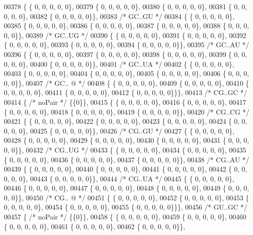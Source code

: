 \begin{DoxyCode}
00378 \{ \{  0, 0, 0, 0, 0\},
00379 \{  0, 0, 0, 0, 0\},
00380 \{  0, 0, 0, 0, 0\},
00381 \{  0, 0, 0, 0, 0\},
00382 \{  0, 0, 0, 0, 0\}\},
00383  \textcolor{comment}{/* GC..GU */}
00384 \{ \{  0, 0, 0, 0, 0\},
00385 \{  0, 0, 0, 0, 0\},
00386 \{  0, 0, 0, 0, 0\},
00387 \{  0, 0, 0, 0, 0\},
00388 \{  0, 0, 0, 0, 0\}\},
00389  \textcolor{comment}{/* GC..UG */}
00390 \{ \{  0, 0, 0, 0, 0\},
00391 \{  0, 0, 0, 0, 0\},
00392 \{  0, 0, 0, 0, 0\},
00393 \{  0, 0, 0, 0, 0\},
00394 \{  0, 0, 0, 0, 0\}\},
00395  \textcolor{comment}{/* GC..AU */}
00396 \{ \{  0, 0, 0, 0, 0\},
00397 \{  0, 0, 0, 0, 0\},
00398 \{  0, 0, 0, 0, 0\},
00399 \{  0, 0, 0, 0, 0\},
00400 \{  0, 0, 0, 0, 0\}\},
00401  \textcolor{comment}{/* GC..UA */}
00402 \{ \{  0, 0, 0, 0, 0\},
00403 \{  0, 0, 0, 0, 0\},
00404 \{  0, 0, 0, 0, 0\},
00405 \{  0, 0, 0, 0, 0\},
00406 \{  0, 0, 0, 0, 0\}\},
00407  \textcolor{comment}{/* GC.. @ */}
00408 \{ \{  0, 0, 0, 0, 0\},
00409 \{  0, 0, 0, 0, 0\},
00410 \{  0, 0, 0, 0, 0\},
00411 \{  0, 0, 0, 0, 0\},
00412 \{  0, 0, 0, 0, 0\}\}\},
00413  \textcolor{comment}{/* CG..GC */}
00414 \{ \textcolor{comment}{/* noPair */} \{\{0\}\},
00415 \{ \{  0, 0, 0, 0, 0\},
00416 \{  0, 0, 0, 0, 0\},
00417 \{  0, 0, 0, 0, 0\},
00418 \{  0, 0, 0, 0, 0\},
00419 \{  0, 0, 0, 0, 0\}\},
00420  \textcolor{comment}{/* CG..CG */}
00421 \{ \{  0, 0, 0, 0, 0\},
00422 \{  0, 0, 0, 0, 0\},
00423 \{  0, 0, 0, 0, 0\},
00424 \{  0, 0, 0, 0, 0\},
00425 \{  0, 0, 0, 0, 0\}\},
00426  \textcolor{comment}{/* CG..GU */}
00427 \{ \{  0, 0, 0, 0, 0\},
00428 \{  0, 0, 0, 0, 0\},
00429 \{  0, 0, 0, 0, 0\},
00430 \{  0, 0, 0, 0, 0\},
00431 \{  0, 0, 0, 0, 0\}\},
00432  \textcolor{comment}{/* CG..UG */}
00433 \{ \{  0, 0, 0, 0, 0\},
00434 \{  0, 0, 0, 0, 0\},
00435 \{  0, 0, 0, 0, 0\},
00436 \{  0, 0, 0, 0, 0\},
00437 \{  0, 0, 0, 0, 0\}\},
00438  \textcolor{comment}{/* CG..AU */}
00439 \{ \{  0, 0, 0, 0, 0\},
00440 \{  0, 0, 0, 0, 0\},
00441 \{  0, 0, 0, 0, 0\},
00442 \{  0, 0, 0, 0, 0\},
00443 \{  0, 0, 0, 0, 0\}\},
00444  \textcolor{comment}{/* CG..UA */}
00445 \{ \{  0, 0, 0, 0, 0\},
00446 \{  0, 0, 0, 0, 0\},
00447 \{  0, 0, 0, 0, 0\},
00448 \{  0, 0, 0, 0, 0\},
00449 \{  0, 0, 0, 0, 0\}\},
00450  \textcolor{comment}{/* CG.. @ */}
00451 \{ \{  0, 0, 0, 0, 0\},
00452 \{  0, 0, 0, 0, 0\},
00453 \{  0, 0, 0, 0, 0\},
00454 \{  0, 0, 0, 0, 0\},
00455 \{  0, 0, 0, 0, 0\}\}\},
00456  \textcolor{comment}{/* GU..GC */}
00457 \{ \textcolor{comment}{/* noPair */} \{\{0\}\},
00458 \{ \{  0, 0, 0, 0, 0\},
00459 \{  0, 0, 0, 0, 0\},
00460 \{  0, 0, 0, 0, 0\},
00461 \{  0, 0, 0, 0, 0\},
00462 \{  0, 0, 0, 0, 0\}\},

\end{DoxyCode}

